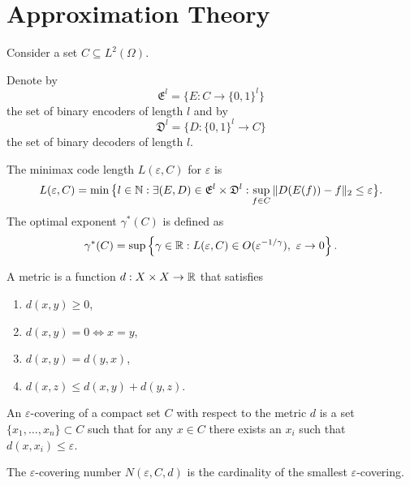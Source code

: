 \section{Approximation Theory}

Consider a set $C\subseteq L^2(\Omega)$. 

\begin{boxdefinition}[]
    Denote by 
    $$
    \mathfrak{E}^l=\{E\colon C\to\{0,1\}^l\}
    $$
    the set of binary encoders of length $l$
    and by 
    $$
    \mathfrak{D}^l=\{D\colon \{0,1\}^l\to C\}
    $$
    the set of binary decoders of length $l$.
\end{boxdefinition}

\begin{boxdefinition}
    The minimax code length $L(\varepsilon,C)$ for 
    $\varepsilon$ is 
    $$
    L(\varepsilon,C)=\min\big\lbrace l\in\mathbb{N}:\exists (E,D)\in
    \mathfrak{E}^l\times\mathfrak{D}^l:
    \sup_{f\in C}\|D(E(f)) -f \|_2\leq\varepsilon\big\rbrace.$$
    The optimal exponent $\gamma^*(C)$ is defined as
    $$
    \gamma^*(C)=\sup\left\lbrace
    \gamma\in\mathbb{R}:L(\varepsilon,C)\in
    O(\varepsilon^{-1/\gamma}),\ \varepsilon\to 0
    \right\rbrace.$$
\end{boxdefinition}
\newpage
\begin{boxdefinition}[]
    A metric is a function $d: X\times X\to\mathbb{R}$ that
    satisfies
    \begin{enumerate}
        \item $d(x,y)\geq 0$,
        \item $d(x,y)=0 \Leftrightarrow x=y$,
        \item $d(x,y)=d(y,x)$,
        \item $d(x,z)\leq d(x,y)+d(y,z)$.
    \end{enumerate}
\end{boxdefinition}

\begin{boxdefinition}
    An $\varepsilon$-covering of a compact set $C$
    with respect to the metric $d$ is a set
    $\{x_1,\dots,x_n\}\subset C$ such that for any
    $x\in C$ there exists an $x_i$ such that 
    $d(x,x_i)\leq \varepsilon$. 
\end{boxdefinition}

\begin{boxdefinition}
    The $\varepsilon$-covering number 
    $N(\varepsilon, C,d)$ is the cardinality of 
    the smallest $\varepsilon$-covering.
\end{boxdefinition}

